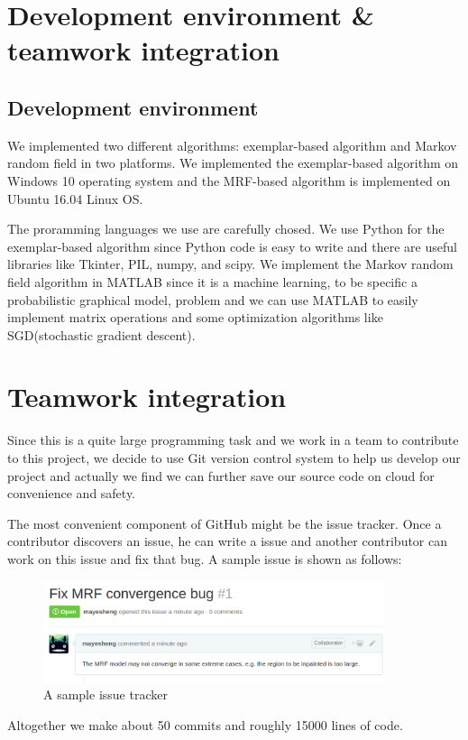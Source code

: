 \section{Development environment \& teamwork integration}
\subsection{Development environment}
We implemented two different algorithms: exemplar-based algorithm and
Markov random field in two platforms. We implemented the exemplar-based
algorithm on Windows 10 operating system and the MRF-based algorithm is
implemented on Ubuntu 16.04 Linux OS.

The proramming languages we use are carefully chosed. We use Python for
the exemplar-based algorithm since Python code is easy to write and there
are useful libraries like Tkinter, PIL, numpy, and scipy. We implement
the Markov random field algorithm in MATLAB since it is a machine learning,
to be specific a probabilistic graphical model, problem and we can use
MATLAB to easily implement matrix operations and some optimization
algorithms like SGD(stochastic gradient descent).
\section{Teamwork integration}
Since this is a quite large programming task and we work in a team to
contribute to this project, we decide to use Git version control system
to help us develop our project and actually we find we can further
save our source code on cloud for convenience and safety.

The most convenient component of GitHub might be the issue tracker. Once
a contributor discovers an issue, he can write a issue and another 
contributor can work on this issue and fix that bug. A sample issue is 
shown as follows:
\begin{figure}
    \centering
    \includegraphics[width=10cm]{sc1.png}
    \caption{A sample issue tracker}
\end{figure}
Altogether we make about 50 commits and roughly 15000 lines of code.
